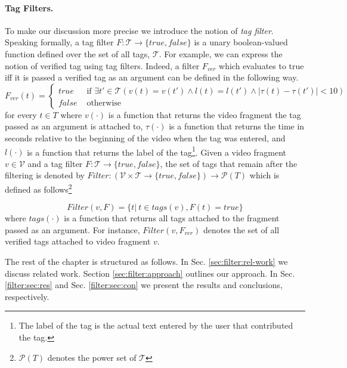 \paragraph{Tag Filters.} To make our discussion more precise 	we introduce the notion of \textit{tag filter}. Speaking formally, a tag filter $F: \mathcal{T}\rightarrow\{true, false\}$ is a unary boolean-valued function defined over the set of all tags, $\mathcal{T}$. For example, we can express the notion of verified tag using tag filters. Indeed, a filter $F_{ver}$ which evaluates to true iff it is passed a verified tag as an argument can be defined in the following way.
\begin{equation*}
F_{ver}(t) = \left\{ 
	\begin{array}{rl}
	true &\mbox{ if $\exists t' \in \mathcal{T} (v(t) = v(t') \wedge l(t) = l(t') \wedge |\tau(t) - \tau(t')| < 10)$} \\
	false &\mbox{ otherwise}
	\end{array}
\right.
\end{equation*}
for every $t \in T$ where $v(\cdot)$ is a function that returns the video fragment the tag passed as an argument is attached to,  $\tau(\cdot)$ is a function that returns the time in seconds relative to the beginning of the video when the tag was entered, and $l(\cdot)$ is a function that returns the label of the tag\footnote{The label of the tag is the actual text entered by the user that contributed the tag.}. Given a video fragment $v \in \mathcal{V}$ and a tag filter $F: \mathcal{T}\rightarrow\{true, false\}$, the set of tags that remain after the filtering is denoted by $Filter:(\mathcal{V} \times \mathcal{T}\rightarrow\{true, false\})\rightarrow \mathcal{P}({T})$ which is defined as follows\footnote{$\mathcal{P}({T})$ denotes the power set of $\mathcal{T}$}

\begin{equation}
Filter(v, F) = \{t |~t \in tags(v), F(t) = true\}
\end{equation}
where $tags(\cdot)$ is a function that returns all tags attached to the fragment passed as an argument.
For instance, $Filter(v, F_{ver})$ denotes the set of all verified tags attached to video fragment $v$.
 
The rest of the chapter is structured as follows. In Sec. \ref{sec:filter:rel-work} we discuss related work. Section \ref{sec:filter:approach} outlines our approach. In Sec. \ref{filter:sec:res} and Sec. \ref{filter:sec:con} we present the results and conclusions, respectively.

